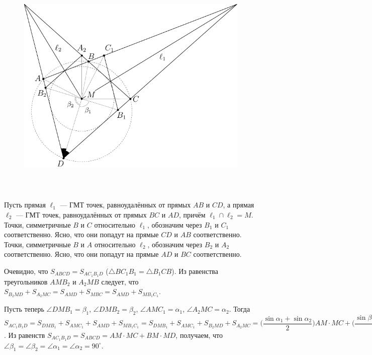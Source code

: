 \documentclass[14pt]{extarticle}
\theoremstyle{definition}
\theoremstyle{theorem}
\begin{document}
\begin{figure}[H]
\centering
\includegraphics[height=11cm]{./figure.pdf}
\end{figure}


Пусть прямая \(\ell_1\) --- ГМТ точек, равноудалённых от прямых \(AB\) 
и \(CD\), а прямая \(\ell_2\) --- ГМТ точек, равноудалённых от прямых 
\(BC\) и \(AD\), причём \(\ell_1 \cap \ell_2 = M\). 
Точки, симметричные \(B\) и \(C\) относительно \(\ell_1\), обозначим через 
\(B_1\) и \(C_1\) соответственно. Ясно, что они попадут на прямые \(CD\) 
и \(AB\) соответственно. 
Точки, симметричные \(B\) и \(A\) относительно \(\ell_2\), обозначим через 
\(B_2\) и \(A_2\) соответственно. Ясно, что они попадут на прямые \(AD\) 
и \(BC\) соответственно.  


Очевидно, что \(S_{ABCD} = 
S_{AC_1B_1D}\) (\(\triangle BC_1B_1 = \triangle B_1CB\)). 
Из равенства треугольников \(AMB_2\) и 
\(A_2MB\) следует, что 
\(S_{B_2MD} + S_{A_2MC} = S_{AMD} + S_{MBC}
 = S_{AMD} + S_{MB_1C_1}\). 

Пусть теперь 
\(\angle DMB_1 = \beta_1\),
\(\angle DMB_2 = \beta_2\),
\(\angle AMC_1 = \alpha_1\),
\(\angle A_2MC = \alpha_2\).
Тогда \(S_{AC_1B_1D} = S_{DMB_1} + S_{AMC_1} + 
S_{AMD} + S_{MB_1C_1} = S_{DMB_1} + S_{AMC_1} + 
S_{B_2MD} + S_{A_2MC} = 
\bigg(\dfrac{\sin \alpha_1 + \sin \alpha_2}{2}\bigg) 
AM \cdot MC + \bigg(\dfrac{\sin \beta_1 + 
\sin \beta_2}{2}\bigg) BM \cdot MD\).
Из равенств \(S_{AC_1B_1D} = S_{ABCD} = AM \cdot MC + 
BM \cdot MD\), получаем, что  \(\angle \beta_1 = 
\angle \beta_2 = \angle \alpha_1 = \angle \alpha_2 
= 90^{\circ}\). 
\end{document}
